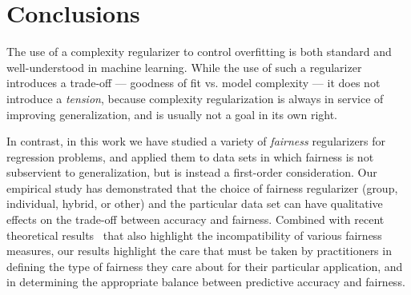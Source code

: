 \section{Conclusions}

The use of a complexity regularizer to control overfitting is both
standard and well-understood in machine learning. While the use of
such a regularizer introduces a trade-off --- goodness of fit
vs. model complexity --- it does not introduce a {\em tension\/},
because complexity regularization is always in service of improving
generalization, and is usually not a goal in its own right.

In contrast, in this work we have studied a variety of {\em
  fairness\/} regularizers for regression problems, and applied them
to data sets in which fairness is not subservient to generalization,
but is instead a first-order consideration.  Our empirical study has
demonstrated that the choice of fairness regularizer (group,
individual, hybrid, or other) and the particular data set can have
qualitative effects on the trade-off between accuracy and
fairness. Combined with recent theoretical
results~\cite{KleinbergMR16,Chouldechova17,FriedlerSV16} that also
highlight the incompatibility of various fairness measures, our
results highlight the care that must be taken by practitioners in
defining the type of fairness they care about for their particular
application, and in determining the appropriate balance between
predictive accuracy and fairness.


